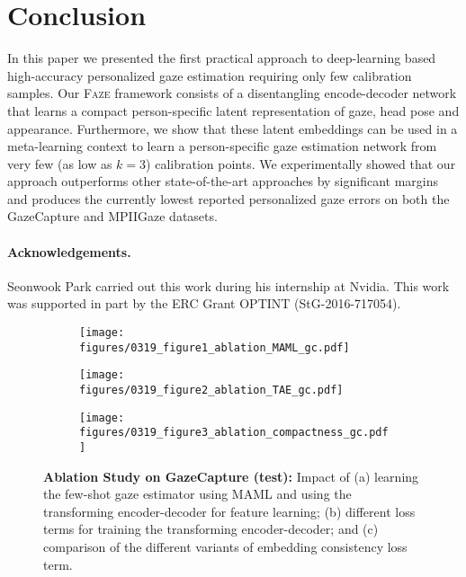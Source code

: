 \documentclass[10pt,twocolumn,letterpaper]{article}
\newcommand{\faze}[0]{\textsc{Faze}\xspace}
\begin{document}
\section{Conclusion}
In this paper we presented the first practical approach to deep-learning based high-accuracy personalized gaze estimation requiring only few calibration samples. Our \faze framework consists of a disentangling encode-decoder network that learns a compact person-specific latent representation of gaze, head pose and appearance. Furthermore, we show that these latent embeddings can be used in a meta-learning context to learn a person-specific gaze estimation network from very few (as low as $k=3$) calibration points. We experimentally showed that our approach outperforms other state-of-the-art approaches by significant margins and produces the currently lowest reported personalized gaze errors on both the GazeCapture and MPIIGaze datasets.

\paragraph{Acknowledgements.}
Seonwook Park carried out this work during his internship at Nvidia.
This work was supported in part by the ERC Grant OPTINT (StG-2016-717054). 
\clearpage
\balance
{\small


}

\clearpage
\balance
\begin{figure*}[]
    \vspace*{3mm}
    \centering
    \begin{subfigure}[b]{0.33\textwidth}
        \texttt{[image: figures/0319\_figure1\_ablation\_MAML\_gc.pdf]}
        \vskip -1mm
        \caption{\vspace{-3mm}}
        \label{fig:maml-vs-nomaml}
    \end{subfigure}
    \hfill
    \begin{subfigure}[b]{0.33\textwidth}
        \texttt{[image: figures/0319\_figure2\_ablation\_TAE\_gc.pdf]}
        \vskip -1mm
        \caption{\vspace{-3mm}}
        \label{fig:impact_of_loss_terms}
    \end{subfigure}
    \begin{subfigure}[b]{0.33\textwidth}
        \texttt{[image: figures/0319\_figure3\_ablation\_compactness\_gc.pdf]}
        \vskip -1mm
        \caption{\vspace{-3mm}}
        \label{fig:impact_of_embedding consistency}
    \end{subfigure}
    \caption{\textbf{Ablation Study on GazeCapture (test):} Impact of (a) learning the few-shot gaze estimator using MAML and using the transforming encoder-decoder for feature learning; (b) different loss terms for training the transforming encoder-decoder; and (c) comparison of the different variants of embedding consistency loss term. 
    }
    \label{fig:ablation}
\end{figure*}
\end{document}
